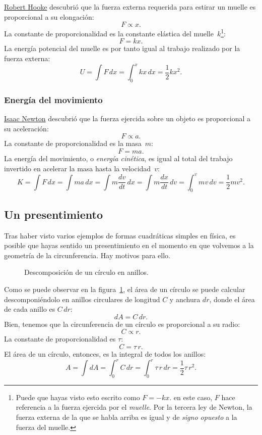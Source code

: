 \href{https://es.wikipedia.org/wiki/Robert_Hooke}{Robert Hooke} descubrió que la fuerza externa requerida para estirar un muelle es proporcional a su elongación:
\[ F \propto x. \]
La constante de proporcionalidad es la constante elástica del muelle~$k$\footnote{Puede que hayas visto esto escrito como $F = -kx$. en este caso, $F$ hace referencia a la fuerza ejercida por el \emph{muelle}. Por la tercera ley de Newton, la fuerza externa de la que se habla arriba es igual y de \emph{signo opuesto} a la fuerza del muelle.}:
\[ F = k x. \]
La energía potencial del muelle es por tanto igual al trabajo realizado por la fuerza externa:
\[ U = \int F\,dx = \int_0^x kx\,dx = \textstyle{\frac{1}{2}} kx^2. \]

    \subsubsection{Energía del movimiento} %
    \label{sec:energy_of_motion}

\href{https://es.wikipedia.org/wiki/Isaac_Newton}{Isaac Newton} descubrió que la fuerza ejercida sobre un objeto es proporcional a su aceleración:
\[ F \propto a. \]
La constante de proporcionalidad es la masa~$m$:
\[ F = m a. \]
La energía del movimiento, o \emph{energía cinética}, es igual al total del trabajo invertido en acelerar la masa hasta la velocidad~$v$:
\[ K = \int F\,dx = \int ma\,dx = \int m\frac{dv}{dt}\,dx = \int m\frac{dx}{dt}\,dv = \int_0^v mv\,dv = \textstyle{\frac{1}{2}} mv^2. \]

  \subsection{Un presentimiento} %
  \label{sec:a_sense_of_foreboding}

Tras haber visto varios ejemplos de formas cuadráticas simples en física, es posible que hayas sentido un presentimiento en el momento en que volvemos a la geometría de la circunferencia. Hay motivos para ello.

\begin{figure}
\begin{center}
\end{center}
\caption{Descomposición de un círculo en anillos.\label{fig:circular_area}}
\end{figure}

Como se puede observar en la figura~\ref{fig:circular_area}, el área de un círculo se puede calcular descomponiéndolo en anillos circulares de longitud $C$ y anchura $dr$, donde el área de cada anillo es $C\,dr$:
\[ dA = C\,dr. \]
Bien, tenemos que la circunferencia de un círculo es proporcional a su radio:
\[ C \propto r. \]
La constante de proporcionalidad es $\tau$:
\[ C = \tau\,r. \]
El área de un círculo, entonces, es la integral de todos los anillos:
\[ A = \int dA = \int_0^r C\,dr = \int_0^r \tau\,r\,dr = \textstyle{\frac{1}{2}} \tau\,r^2. \]

